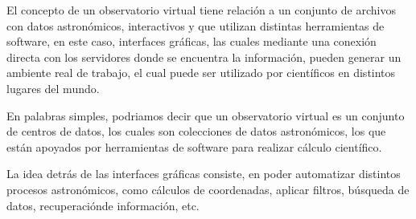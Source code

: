 El concepto de un observatorio virtual tiene relación a un conjunto de archivos
con datos astronómicos, interactivos y que utilizan distintas
herramientas de software, en este caso, interfaces gráficas, las cuales
mediante una conexión directa con los servidores donde se encuentra
la información, pueden generar un ambiente real de trabajo,
el cual puede ser utilizado por científicos en distintos lugares del mundo.

En palabras simples, podriamos decir que un observatorio virtual es un conjunto
de centros de datos, los cuales son colecciones de datos astronómicos,
los que están apoyados por herramientas de software para realizar
cálculo científico.

La idea detrás de las interfaces gráficas consiste,
en poder automatizar distintos procesos astronómicos,
como cálculos de coordenadas, aplicar filtros, búsqueda
de datos, recuperaciónde información, etc.

%

